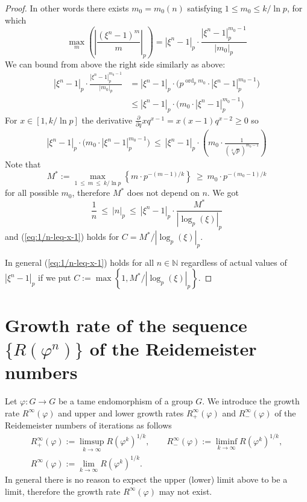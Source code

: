 \documentclass[12pt, a4paper]{amsart}
\def\ln{\operatorname{ln}}
\def\ord{\operatorname{ord}}
\def\N{{\mathbb N}}
\begin{document}
\begin{proof}
  In other words there exists $m_0 = m_0(n)$ satisfying $1 \leq m_0 \leq k/\ln p$, for which
  \begin{equation*} %
    \max_m \left( \left|\frac{(\xi^n - 1)^m}{m} \right|_p \right)
    = |\xi^n-1|_p \cdot \frac{\left| \xi^n-1 \right|_p^{m_0-1}}{|m_0|_p}
  \end{equation*}
  We can bound from above the right side similarly as above:
  \begin{align*}
    |\xi^n-1|_p \cdot \frac{\left| \xi^n-1 \right|_p^{m_0-1}}{|m_0|_p}
    &=  |\xi^n-1|_p \cdot \Big( p^{\ord_p m_0} \cdot \left| \xi^n-1 \right|_p^{m_0-1} \Big) \\
    &\leq |\xi^n-1|_p \cdot \Big( m_0 \cdot \left| \xi^n-1 \right|_p^{m_0-1} \Big)
  \end{align*}
  For $x \in [1, k/\ln p]$ the derivative $\frac{\partial}{\partial q} xq^{x-1} = x(x-1)q^{x-2} \geq 0$ so
  \begin{align*}
    |\xi^n-1|_p \cdot \Big( m_0 \cdot \left| \xi^n-1 \right|_p^{m_0-1} \Big)
    \ \leq \  |\xi^n-1|_p \cdot \left( m_0 \cdot \frac{1}{(\sqrt[k]{p})^{m_0-1}} \right)
  \end{align*}
  Note that
  \[
    M^* := \max_{1 \ \leq \ m \ \leq \ k/\ln p} \left\{ m \cdot p^{-(m-1)/k} \right\}
    \ \geq \ m_0 \cdot p^{-(m_0-1)/k}
  \]
  for all possible $m_0$, therefore $M^*$ does not depend on $n$. We got
  \[
    \frac{1}{n} \ \leq \ |n|_p \ \leq \ |\xi^n-1|_p \cdot \frac{M^*}{|\log_p(\xi)|_p}
  \]
  and (\ref{eq:1/n-leq-x-1}) holds for $C = M^* / |\log_p(\xi)|_p$.

  In general (\ref{eq:1/n-leq-x-1}) holds for all $n \in \N$ regardless of actual values of $|\xi^n-1|_p$
  if we put $C := \max \left\{1, M^* / |\log_p(\xi)|_p \right\}$.
\end{proof}


\bigskip
\section{Growth rate of the sequence $\{R(\varphi^n)\}$ of the Reidemeister numbers}\label{sec:growth-reidemeister}

Let $\varphi: G \to G$ be a tame endomorphism of a group $G$.
We introduce the growth rate  $R^{\infty}(\varphi)$ and  upper and lower growth rates
$R^{\infty}_{+}(\varphi)$  and  $R^{\infty}_{-}(\varphi)$ of the Reidemeister numbers
of iterations as follows
\begin{gather*}
  R^\infty_{+}(\varphi):=\limsup_{k\to\infty}R(\varphi^k)^{1/k}, \qquad
  R^\infty_{-}(\varphi):=\liminf_{k\to\infty}R(\varphi^k)^{1/k},\\
    R^\infty(\varphi):=\lim_{k\to\infty}R(\varphi^k)^{1/k}.
\end{gather*}
In general there is no reason to expect the upper (lower) limit above to be a limit,
therefore the growth rate $R^\infty(\varphi)$ may not exist.
\end{document}
